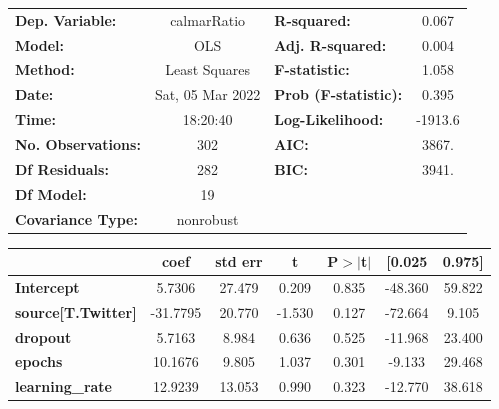 \begin{center}
\begin{tabular}{lclc}
\toprule
\textbf{Dep. Variable:}                   &   calmarRatio    & \textbf{  R-squared:         } &     0.067   \\
\textbf{Model:}                           &       OLS        & \textbf{  Adj. R-squared:    } &     0.004   \\
\textbf{Method:}                          &  Least Squares   & \textbf{  F-statistic:       } &     1.058   \\
\textbf{Date:}                            & Sat, 05 Mar 2022 & \textbf{  Prob (F-statistic):} &    0.395    \\
\textbf{Time:}                            &     18:20:40     & \textbf{  Log-Likelihood:    } &   -1913.6   \\
\textbf{No. Observations:}                &         302      & \textbf{  AIC:               } &     3867.   \\
\textbf{Df Residuals:}                    &         282      & \textbf{  BIC:               } &     3941.   \\
\textbf{Df Model:}                        &          19      & \textbf{                     } &             \\
\textbf{Covariance Type:}                 &    nonrobust     & \textbf{                     } &             \\
\bottomrule
\end{tabular}
\begin{tabular}{lcccccc}
                                          & \textbf{coef} & \textbf{std err} & \textbf{t} & \textbf{P$> |$t$|$} & \textbf{[0.025} & \textbf{0.975]}  \\
\midrule
\textbf{Intercept}                        &       5.7306  &       27.479     &     0.209  &         0.835        &      -48.360    &       59.822     \\
\textbf{source[T.Twitter]}                &     -31.7795  &       20.770     &    -1.530  &         0.127        &      -72.664    &        9.105     \\
\textbf{dropout}                          &       5.7163  &        8.984     &     0.636  &         0.525        &      -11.968    &       23.400     \\
\textbf{epochs}                           &      10.1676  &        9.805     &     1.037  &         0.301        &       -9.133    &       29.468     \\
\textbf{learning\_rate}                   &      12.9239  &       13.053     &     0.990  &         0.323        &      -12.770    &       38.618     \\

\end{tabular}
\end{center}

